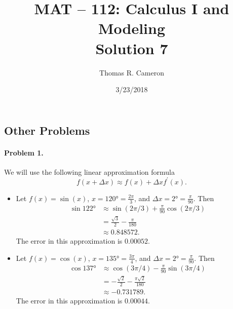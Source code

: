 \documentclass{article}
\title{MAT -- 112: Calculus I and Modeling\\
\large{Solution 7}}
\author{Thomas R. Cameron}
\date{3/23/2018}
\begin{document}
\maketitle

\subsection*{Other Problems}

\paragraph*{Problem 1.} We will use the following linear approximation formula
\[
f(x+\Delta x)\approx f(x)+\Delta x f^{'}(x).
\]
\begin{itemize}
\item	Let $f(x)=\sin(x)$, $x=\ang{120}=\frac{2\pi}{3}$, and $\Delta x=\ang{2}=\frac{\pi}{90}$. Then
\begin{align*}
\sin\ang{122}&\approx \sin(2\pi/3)+\frac{\pi}{90}\cos(2\pi/3) \\
&=\frac{\sqrt{3}}{2}-\frac{\pi}{180} \\
&\approx 0.848572.
\end{align*}
The error in this approximation is $0.00052$. 
\item	Let $f(x)=\cos(x)$, $x=\ang{135}=\frac{3\pi}{4}$, and $\Delta x=\ang{2}=\frac{\pi}{90}$. Then
\begin{align*}
\cos\ang{137}&\approx\cos(3\pi/4)-\frac{\pi}{90}\sin(3\pi/4) \\
&=-\frac{\sqrt{2}}{2}-\frac{\pi\sqrt{2}}{180} \\
&\approx -0.731789.
\end{align*}
The error in this approximation is $0.00044$. 
\end{itemize}
\end{document}
